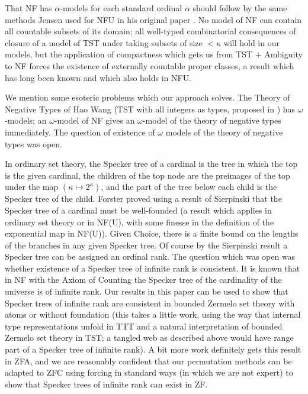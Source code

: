\documentclass[112pt]{article}
\theoremstyle{definition}
\theoremstyle{remark}
\newcommand{\rk}[1]{{\color{blue}\sl #1}}
\begin{document}
That NF has $\alpha$-models for each standard ordinal $\alpha$ should follow by the same methods Jensen used for NFU in his original paper \cite{nfu}.  %
  No model of NF can contain all countable subsets of its domain;  all well-typed combinatorial consequences
of closure of a model of TST under taking subsets of size $<\kappa$ will hold in our models, but the application of compactness which gets us from TST + Ambiguity to NF forces the existence of externally countable proper classes, a result which has long been known and which also holds in NFU.

We mention some esoteric problems which our approach solves.  The Theory of Negative Types of Hao Wang (TST with all integers as types, proposed in \cite{tnt})  has $\omega$-models;  an $\omega$-model of NF gives an $\omega$-model of the theory of negative types  immediately.  The question of existence of $\omega$ models of the theory of negative types was open.

In ordinary set theory, the Specker tree of a cardinal is the tree in which the top is the given cardinal, the children of the top node  are the preimages of the top under the map $(\kappa \mapsto 2^{\kappa})$, and the part of the tree
below each child is the Specker tree of the child.  Forster proved using a result of Sierpinski that the Specker tree of a cardinal must be well-founded (a result which applies in ordinary set theory or in NF(U), with some finesse in the definition of the exponential map in NF(U)).  Given Choice, there is a finite bound on the lengths of the branches in any given Specker tree.  Of course by the Sierpinski result a Specker tree can be assigned an ordinal rank.  The question which was open
was whether existence of a Specker tree of infinite rank is consistent.  It is known that in NF with the Axiom of Counting the Specker tree of the cardinality of the universe is of infinite rank.  Our results in this paper can be used to show that Specker trees of infinite rank are consistent in bounded Zermelo set theory with atoms or without foundation (this takes a little work, using the way that internal type representations unfold in TTT and a natural interpretation of bounded Zermelo set theory in TST;  a tangled web as described above would have range part of a Specker tree of infinite rank).  A bit more work definitely gets this result in ZFA, and we are reasonably confident that our permutation methods can be adapted to ZFC using forcing in standard ways (in which we are not expert) to show that Specker trees of infinite rank can exist in ZF.
\end{document}
